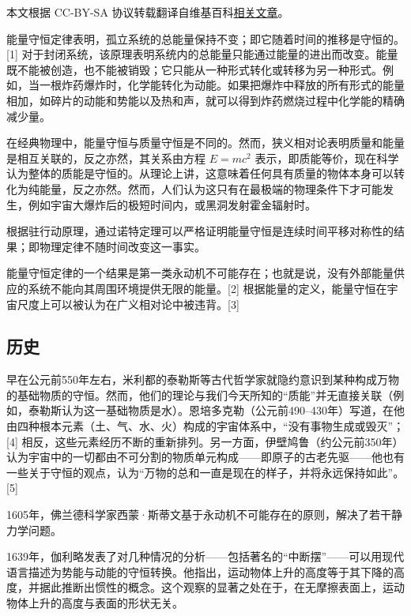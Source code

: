 
本文根据 CC-BY-SA 协议转载翻译自维基百科\href{https://en.wikipedia.org/wiki/Conservation_of_energy}{相关文章}。

能量守恒定律表明，孤立系统的总能量保持不变；即它随着时间的推移是守恒的。[1] 对于封闭系统，该原理表明系统内的总能量只能通过能量的进出而改变。能量既不能被创造，也不能被销毁；它只能从一种形式转化或转移为另一种形式。例如，当一根炸药爆炸时，化学能转化为动能。如果把爆炸中释放的所有形式的能量相加，如碎片的动能和势能以及热和声，就可以得到炸药燃烧过程中化学能的精确减少量。

在经典物理中，能量守恒与质量守恒是不同的。然而，狭义相对论表明质量和能量是相互关联的，反之亦然，其关系由方程 \( E = mc^2 \) 表示，即质能等价，现在科学认为整体的质能是守恒的。从理论上讲，这意味着任何具有质量的物体本身可以转化为纯能量，反之亦然。然而，人们认为这只有在最极端的物理条件下才可能发生，例如宇宙大爆炸后的极短时间内，或黑洞发射霍金辐射时。

根据驻行动原理，通过诺特定理可以严格证明能量守恒是连续时间平移对称性的结果；即物理定律不随时间改变这一事实。

能量守恒定律的一个结果是第一类永动机不可能存在；也就是说，没有外部能量供应的系统不能向其周围环境提供无限的能量。[2] 根据能量的定义，能量守恒在宇宙尺度上可以被认为在广义相对论中被违背。[3]
\subsection{历史}
早在公元前550年左右，米利都的泰勒斯等古代哲学家就隐约意识到某种构成万物的基础物质的守恒。然而，他们的理论与我们今天所知的“质能”并无直接关联（例如，泰勒斯认为这一基础物质是水）。恩培多克勒（公元前490–430年）写道，在他由四种根本元素（土、气、水、火）构成的宇宙体系中，“没有事物生成或毁灭”；[4] 相反，这些元素经历不断的重新排列。另一方面，伊壁鸠鲁（约公元前350年）认为宇宙中的一切都由不可分割的物质单元构成——即原子的古老先驱——他也有一些关于守恒的观点，认为“万物的总和一直是现在的样子，并将永远保持如此”。[5]

1605年，佛兰德科学家西蒙·斯蒂文基于永动机不可能存在的原则，解决了若干静力学问题。

1639年，伽利略发表了对几种情况的分析——包括著名的“中断摆”——可以用现代语言描述为势能与动能的守恒转换。他指出，运动物体上升的高度等于其下降的高度，并据此推断出惯性的概念。这个观察的显著之处在于，在无摩擦表面上，运动物体上升的高度与表面的形状无关。

